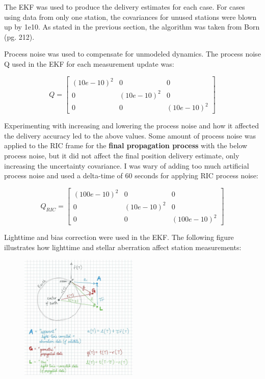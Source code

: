 \documentclass[conf]{new-aiaa}
\begin{document}
The EKF was used to produce the delivery estimates for each case. For cases using data from only one station, the covariances for unused stations were blown up by 1e10. As stated in the previous section, the algorithm was taken from Born\cite{born_statorbitdet} (pg. 212). 

Process noise was used to compensate for unmodeled dynamics. The process noise Q used in the EKF for each measurement update was: 

\begin{equation}
	Q = \begin{bmatrix}
		(10e-10)^2	& 0 & 0 \\ 
		0 & (10e-10)^2 & 0 \\ 
		0 & 0 & (10e-10)^2
	\end{bmatrix}
\end{equation} 

Experimenting with increasing and lowering the process noise and how it affected the delivery accuracy led to the above values. Some amount of process noise was applied to the RIC frame for the \textbf{final propagation process } with the below process noise, but it did not affect the final position delivery estimate, only increasing the uncertainty covariance. I was wary of adding too much artificial process noise and used a delta-time of 60 seconds for applying RIC process noise: 

\begin{equation}
	Q_{RIC} = \begin{bmatrix}
		(100e-10)^2	& 0 & 0 \\ 
		0 & (10e-10)^2 & 0 \\ 
		0 & 0 & (100e-10)^2
	\end{bmatrix}
\end{equation}

Lighttime and bias correction were used in the EKF. The following figure  illustrates how lighttime and stellar aberration affect station measurements: 

\begin{figure}[H]
	\centering
	\includegraphics[width=0.5\textwidth]{lt_aberr.jpg}
	\label{fig:lt_aberr}
\end{figure}
\end{document}
